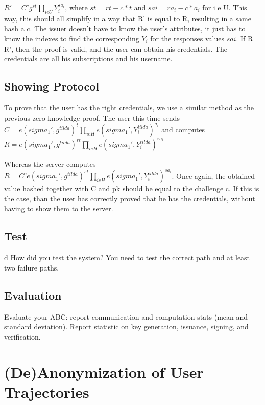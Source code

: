 \documentclass[10pt,conference,compsocconf]{IEEEtran}
\begin{document}
$ R' = C^c g^{st} \prod_{i e U}{Y_{i}^{sa_{i}}}$, where $st = rt - c*t$ and $sai = ra_{i} - c*a_{i}$ for i e U. This way, this should all simplify in a way that R' is equal to R, resulting in a same hash a c. The issuer doesn't have to know the user's attributes, it just has to know the indexes to find the corresponding $Y_{i}$ for the responses values $sai$.
If R = R', then the proof is valid, and the user can obtain his credentials. The credentials are all his subscriptions and his username.

\subsection{Showing Protocol}
To prove that the user has the right credentials, we use a similar method as the previous zero-knowledge proof. The user this time sends $C = e(sigma_{1}',g^{tilda})^t \prod_{i e H} e(sigma_{1}',Y_{i}^{tilda})^{a_{i}}$ and computes $ R = e(sigma_{1}',g^{tilda})^{rt} \prod_{i e H} e(sigma_{1}',Y_{i}^{tilda})^{ra_{i}}$ 
\\	
\hspace{1cm}

Whereas the server computes \\ $ R = C^c  e(sigma_{1}',g^{tilda})^{st} \prod_{i e H} e(sigma_{1}',Y_{i}^{tilda})^{sa_{i}}$. Once again, the obtained value hashed together with C and pk should be equal to the challenge c. If this is the case, than the user has correctly proved that he has the credentials, without having to show them to the server. 


\subsection{Test}d
How did you test the system?
You need to test the correct path and at least two failure paths.

\subsection{Evaluation}
Evaluate your ABC: report communication and computation stats (mean and standard
deviation). Report statistic on key generation, issuance, signing, and
verification.

\section{(De)Anonymization of User Trajectories}
\end{document}
